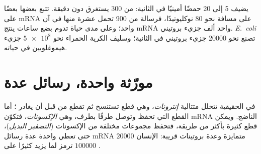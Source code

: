 \begin{example}\label{ex:g11:gene-expression:speed}
يضيف  5 إلى 20 حمضًا أمينيًا في الثانية:  من 300  يستغرق دون دقيقة.  تتبع بعضها بعضًا على mRNA على
مسافة نحو 80 نوكليوتيدًا، فرسالة من 900  تحمل عشرة منها في آن
واحد؛ وعلى مدى حياة تدوم بضع ساعات ينتج mRNA واحد ألف جزيء بروتيني.
 \emph{E.~coli} تصنع نحو $\num{20000}$ جزيء بروتيني في الثانية؛
وسليف الكرية الحمراء نحو $\num{5e8}$ جزيء هيموغلوبين في حياته.
\end{example}

\section{مورّثة واحدة، رسائل عدة}

\begin{proposition}\label{prop:g11:gene-expression:splicing}
في  الحقيقية  تتخلل متتالية 
\emph{إنترونات}، وهي قطع تستنسخ ثم تقطع من  قبل أن
يغادر ؛ أما القطع التي تحفظ وتوصل طرفًا بطرف، وهي
\emph{الإكسونات}، فتكوّن mRNA الناضج. ويمكن قطع  كثيرة بأكثر من
طريقة، فتحفظ مجموعات مختلفة من الإكسونات (\emph{التضفير البديل})، حتى
تعطي  واحدة عدة رسائل mRNA متمايزة وعدة بروتينات قريبة: 
الإنسان $\num{20000}$ ترمز لما يزيد كثيرًا على $\num{100000}$ .
\end{proposition}
\admitted

